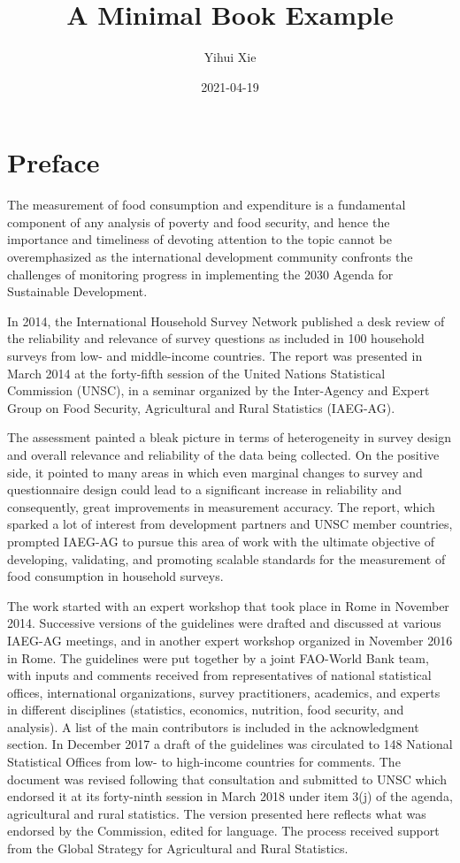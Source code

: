 \documentclass[
]{book}
\title{A Minimal Book Example}
\author{Yihui Xie}
\date{2021-04-19}
\begin{document}
\maketitle

{
\setcounter{tocdepth}{1}
\tableofcontents
}
\hypertarget{preface}{%
\chapter*{Preface}\label{preface}}

The measurement of food consumption and expenditure is a fundamental component of any analysis of poverty and food security,
and hence the importance and timeliness of devoting attention to the topic cannot be overemphasized as the international
development community confronts the challenges of monitoring progress in implementing the 2030 Agenda for Sustainable
Development.

In 2014, the International Household Survey Network published a desk review of the reliability and relevance of survey questions
as included in 100 household surveys from low- and middle-income countries. The report was presented in March 2014
at the forty-fifth session of the United Nations Statistical Commission (UNSC), in a seminar organized by the Inter-Agency and
Expert Group on Food Security, Agricultural and Rural Statistics (IAEG-AG).

The assessment painted a bleak picture in terms of heterogeneity in survey design and overall relevance and reliability of the
data being collected. On the positive side, it pointed to many areas in which even marginal changes to survey and questionnaire
design could lead to a significant increase in reliability and consequently, great improvements in measurement accuracy.
The report, which sparked a lot of interest from development partners and UNSC member countries, prompted IAEG-AG to
pursue this area of work with the ultimate objective of developing, validating, and promoting scalable standards for the measurement
of food consumption in household surveys.

The work started with an expert workshop that took place in Rome in November 2014. Successive versions of the guidelines
were drafted and discussed at various IAEG-AG meetings, and in another expert workshop organized in November 2016 in
Rome. The guidelines were put together by a joint FAO-World Bank team, with inputs and comments received from representatives
of national statistical offices, international organizations, survey practitioners, academics, and experts in different disciplines
(statistics, economics, nutrition, food security, and analysis). A list of the main contributors is included in the acknowledgment
section. In December 2017 a draft of the guidelines was circulated to 148 National Statistical Offices from low- to high-income
countries for comments. The document was revised following that consultation and submitted to UNSC which endorsed it at
its forty-ninth session in March 2018 under item 3(j) of the agenda, agricultural and rural statistics. The version presented here
reflects what was endorsed by the Commission, edited for language. The process received support from the Global Strategy
for Agricultural and Rural Statistics.
\end{document}
